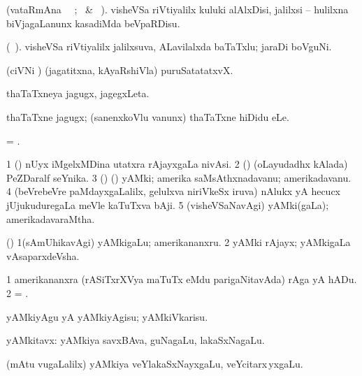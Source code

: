 \bentry
{} 
\gl{\sakirx} 
\bmng
(vataRmAna  \parxpu\  \Eva\ ; \BU\ \& \BUkaq\ ). 
visheVSa riVtiyalilx kuluki alAlxDisi, jalilxsi -- hulilxna biVjagaLanunx kasadiMda beVpaRDisu.
\emng
\eentry

\bentry
{} 
\gl{\nA}  
\bmng
(\bava\ ).
visheVSa riVtiyalilx jalilxsuva, ALavilalxda baTaTxlu; jaraDi boVguNi.
\emng
\eentry

\bentry
{}  
\gl{\nA} 
\bmng
(ciVNi \tashA) (jagatitxna, kAyaRshiVla) puruSatatatxvX.
\emng 
\eentry

\bentry
{} 
\gl{\nA} 
\bmng
thaTaTxneya jagugx, jagegxLeta.
\emng
\eentry

\bentry
{} 
\gl{\sakirx} 
\bmng
thaTaTxne jagugx; (sanenxkoVlu \mo vanunx) thaTaTxne hiDidu eLe.
\emng
\eentry

\bentry
{} 
\gl{\nA}
\bmng
= .
\emng
\eentry

\bentry
{} 
\gl{\nA} 
\bmng
\bnum
\num{1} (\ame) nUyx iMgelxMDina utatxra rAjayxgaLa nivAsi. 
\num{2} (\ca) (oLayudadhx kAlada) PeZDaralf seYnika. 
\hypertarget{Yankee(3)}{}
\num{3} (\AmA) (\hiV) yAMki;  amerika saMsAthxnadavanu; amerikadavanu. 
\num{4} (beVrebeVre paMdayxgaLalilx, gelulxva niriVkeSx iruva) nAlukx  yA hecucx jUjukuduregaLa meVle kaTuTxva bAji. 
\num{5} (visheVSaNavAgi) yAMki(gaLa); amerikadavaraMtha.
\enum
\emng 
\eentry

\bentry
{} 
\gl{\nA}  
\bmng
(\AmA)
\bnum 
\num{1}(sAmUhikavAgi) yAMkigaLu; amerikananxru. 
\num{2} yAMki rAjayx; yAMkigaLa vAsaparxdeVsha.
\enum
\emng 
\eentry

\bentry
{} 
\gl{\nA} 
\bmng
\bnum
\num{1} amerikananxra (rASiTxrXVya maTuTx eMdu parigaNitavAda) rAga yA hADu.
\num{2} = .
\enum
\emng
\eentry

\bentry
{} 
\gl{\sakirx} 
\bmng
yAMkiyAgu yA yAMkiyAgisu; yAMkiVkarisu.
\emng
\eentry

\bentry
{} 
\gl{\nA} 
\bmng
yAMkitavx:
\banum
{}  yAMkiya  savxBAva, guNagaLu, lakaSxNagaLu. 

 (mAtu \mo vugaLalilx) yAMkiya veYlakaSxNayxgaLu, veYcitarx\,yxgaLu. 

